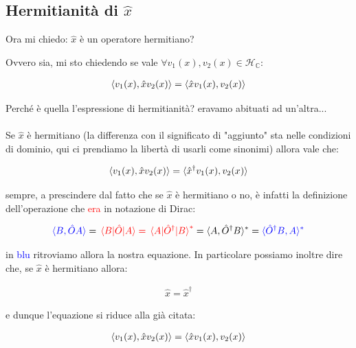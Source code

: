 \subsection{Hermitianità di $\hat{x}$ }

	Ora mi chiedo: $\hat{x}$ è un operatore hermitiano?

\begin{nb}
	Ovvero sia, mi sto chiedendo se vale $\forall v_1(x), v_2(x) \in \mathcal{H}_{\mathbb{C}}$:
	
\begin{align*}
	\langle v_1(x), \hat{x}v_2(x) \rangle = \langle \hat{x}v_1(x), v_2(x) \rangle
\end{align*}

\end{nb}

\begin{myapprf}

	Perché è quella l'espressione di hermitianità? eravamo abituati ad un'altra... 
	\\
	\\
	Se $\hat{x}$ è hermitiano (la differenza con il significato di "aggiunto" sta nelle condizioni di dominio, qui ci prendiamo la libertà di usarli come sinonimi) allora vale che:
	
\begin{align*}
	\langle v_1(x), \hat{x}v_2(x) \rangle = \langle \hat{x}^{\dagger} v_1(x), v_2(x) \rangle
\end{align*}
	
	sempre, a prescindere dal fatto che se $\hat{x}$ è hermitiano o no, è infatti la definizione dell'operazione che \textcolor{red}{era} in notazione di Dirac:
	
\begin{align*}
	\textcolor{blue}{\langle B, \hat{O} A \rangle }= \textcolor{red}{ \mel{B}{\hat{O}}{A} = \mel{A}{\hat{O}^{\dagger}}{B}^*} = \langle A, \hat{O}^{\dagger}B \rangle^* = \textcolor{blue}{\langle \hat{O}^{\dagger}B, A \rangle^*}
\end{align*}

	in \textcolor{blue}{blu} ritroviamo allora la nostra equazione. In particolare possiamo inoltre dire che, se $\hat{x}$ è hermitiano allora:

\begin{align*}
	\hat{x} = \hat{x}^{\dagger}
\end{align*}

	e dunque l'equazione si riduce alla già citata:
	
\begin{align*}
	\langle v_1(x), \hat{x}v_2(x) \rangle = \langle \hat{x}v_1(x), v_2(x) \rangle
\end{align*}

\end{myapprf}

